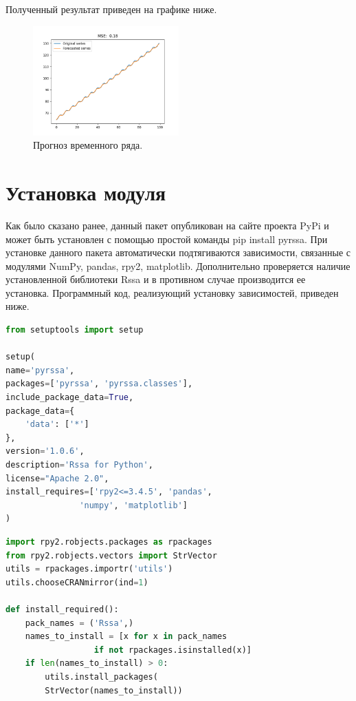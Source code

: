 \documentclass[specialist,
			   substylefile = spbu_report.rtx,
			   subf,href,colorlinks=true, 12pt]{disser}
\begin{document}
Полученный результат приведен на графике ниже.

\begin{figure}[H]
	\centering
	\includegraphics[width=0.5\textwidth]{mpy_for}
	\caption{Прогноз временного ряда.}
	\label{fig:mpy_for}
\end{figure}

\section{Установка модуля}

Как было сказано ранее, данный пакет опубликован на сайте проекта PyPi \cite{pyrssa-lib} и может быть установлен с помощью простой команды pip install pyrssa. При установке данного пакета автоматически подтягиваются зависимости, связанные с модулями NumPy, pandas, rpy2, matplotlib. Дополнительно проверяется наличие установленной библиотеки Rssa и в противном случае производится ее установка. Программный код, реализующий установку зависимостей, приведен ниже.

\begin{lstlisting}[language=Python, caption=Настройки проекта для публикации пакета на сайте PyPi.]
from setuptools import setup

setup(
name='pyrssa',
packages=['pyrssa', 'pyrssa.classes'],
include_package_data=True,
package_data={
	'data': ['*']
},
version='1.0.6',
description='Rssa for Python',
license="Apache 2.0",
install_requires=['rpy2<=3.4.5', 'pandas', 
               'numpy', 'matplotlib']
)
\end{lstlisting}

\begin{lstlisting}[language=Python, caption=Содержимое файла для инсталляции модуля Rssa.]
import rpy2.robjects.packages as rpackages
from rpy2.robjects.vectors import StrVector
utils = rpackages.importr('utils')
utils.chooseCRANmirror(ind=1)

def install_required():
	pack_names = ('Rssa',)
	names_to_install = [x for x in pack_names 
                  if not rpackages.isinstalled(x)]
	if len(names_to_install) > 0:
		utils.install_packages(
		StrVector(names_to_install))
\end{lstlisting}
\end{document}
